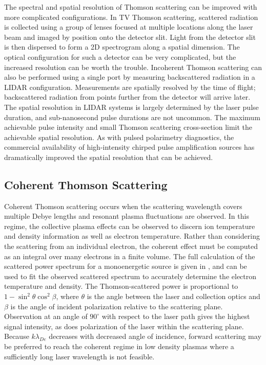\documentclass{jpp}
\begin{document}
The spectral and spatial resolution of Thomson scattering can be improved with more complicated configurations. In TV Thomson scattering, scattered radiation is collected using a group of lenses focused at multiple locations along the laser beam and imaged by position onto the detector slit. Light from the detector slit is then dispersed to form a 2D spectrogram along a spatial dimension. The optical configuration for such a detector can be very complicated, but the increased resolution can be worth the trouble. Incoherent Thomson scattering can also be performed using a single port by measuring backscattered radiation in a LIDAR configuration. Measurements are spatially resolved by the time of flight; backscattered radiation from points further from the detector will arrive later. The spatial resolution in LIDAR systems is largely determined by the laser pulse duration, and sub-nanosecond pulse durations are not uncommon. The maximum achievable pulse intensity and small Thomson scattering cross-section limit the achievable spatial resolution. As with pulsed polarimetry diagnostics, the commercial availability of high-intensity chirped pulse amplification sources has dramatically improved the spatial resolution that can be achieved.

\subsection{Coherent Thomson Scattering}

Coherent Thomson scattering occurs when the scattering wavelength covers multiple Debye lengths and resonant plasma fluctuations are observed. In this regime, the collective plasma effects can be observed to discern ion  temperature and density information as well as electron temperature. Rather than considering the scattering from an individual electron, the coherent effect must be computed as an integral over many electrons in a finite volume. The full calculation of the scattered power spectrum for a monoenergetic source is given in \citep{https://doi.org/10.1029/JZ065i009p02635}, and can be used to fit the observed scattered spectrum to accurately determine the electron temperature and density. The Thomson-scattered power is proportional to $1 - \sin ^2 \theta \cos ^2 \beta$, where $\theta$ is the angle between the laser and collection optics and $\beta$ is the angle of incident polarization relative to the scattering plane. Observation at an angle of $90^\circ$ with respect to the laser path gives the highest signal intensity, as does polarization of the laser within the scattering plane. Because $k \lambda_{De}$ decreases with decreased angle of incidence, forward scattering may be preferred to reach the coherent regime in low density plasmas where a sufficiently long laser wavelength is not feasible.
\end{document}
